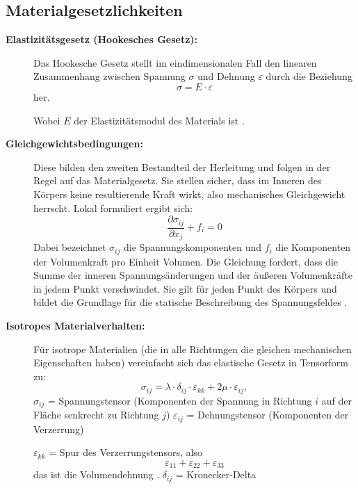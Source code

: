 \subsection{Materialgesetzlichkeiten}
\begin{description}	
	\item[\textbf{Elastizitätsgesetz (Hookesches Gesetz):}] Das Hookesche Gesetz stellt im eindimensionalen Fall den linearen Zusammenhang zwischen Spannung $\sigma$ und Dehnung $\varepsilon$ durch die Beziehung 
	\begin{equation}
		\sigma = 
		E \cdot \varepsilon
	\end{equation}
	 her.
	 
	 Wobei $E$ der Elastizitätsmodul des Materials ist \cite{elastomechanik:Kontinuumsmechanik}.
	 \item[\textbf{Gleichgewichtsbedingungen:}] Diese bilden den zweiten Bestandteil der Herleitung und folgen in der Regel auf das Materialgesetz. 
	 Sie stellen sicher, dass im Inneren des Körpers keine resultierende Kraft wirkt, also mechanisches Gleichgewicht herrscht.
	 Lokal formuliert ergibt sich:
	 \begin{equation}
	 	\frac{\partial \sigma_{ij}}{\partial x_j} + f_i =
	 	0
	 \end{equation}
	 Dabei bezeichnet $\sigma_{ij}$ die Spannungskomponenten und $f_i$ die Komponenten der Volumenkraft pro Einheit Volumen. 
	 Die Gleichung fordert, dass die Summe der inneren Spannungsänderungen und der äußeren Volumenkräfte in jedem Punkt verschwindet. Sie gilt für jeden Punkt des Körpers und bildet die Grundlage für die statische Beschreibung des Spannungsfeldes \cite{elastomechanik:Grundlagen der Elastizitaetstheorie}.
	 \item[\textbf{Isotropes Materialverhalten:}] Für isotrope Materialien (die in alle Richtungen die gleichen mechanischen Eigenschaften haben) vereinfacht sich das elastische Gesetz in Tensorform zu:
	 \begin{equation}
	 	\sigma_{ij} = 
	 	\lambda \cdot \delta_{ij} \cdot \varepsilon_{kk} + 2\mu \cdot \varepsilon_{ij},
	 \end{equation}
	$\sigma_{ij}$ = Spannungstensor (Komponenten der Spannung in Richtung $i$ auf der Fläche senkrecht zu Richtung $j$)
	$\varepsilon_{ij}$ = Dehnungstensor (Komponenten der Verzerrung)
	
	$\varepsilon_{kk}$ = Spur des Verzerrungstensors, also
	\begin{equation}
		\varepsilon_{11} + \varepsilon_{22} + \varepsilon_{33}
	\end{equation}
	das ist die Volumendehnung \cite{elastomechanik:Grundlagen der Elastizitaetstheorie}.
	 $\delta_{ij}$ = Kronecker-Delta 
	 

\end{description}
